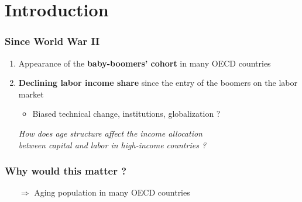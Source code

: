 \documentclass[usenames,dvipsnames]{beamer}
\begin{document}
	\section{Introduction}
	\begin{frame}\frametitle{Since World War II} %
		\begin{enumerate}[default]
			\item Appearance of the \textbf{baby-boomers' cohort} in many OECD countries
			\vspace{2em}
			\item \textbf{Declining labor income share} since the entry of the boomers on the labor market
			\begin{itemize}
				\item Biased technical change, institutions, globalization ?
			\end{itemize}
		\end{enumerate}
		\vfill
		\begin{itemize}
			\item[] {\Large \textit{How does age structure affect the income allocation\\\vspace{1em}
					between capital and labor in high-income countries ?}}
		\end{itemize}
	\end{frame}
	\begin{frame}\frametitle{Why would this matter ?}
		\begin{itemize}
			\item[$\Rightarrow$] Aging population in many OECD countries
		\end{itemize}
		\begin{figure}[b]
			< Old-age dependency ratio figure >
		\end{figure}
	\end{frame}
\end{document}
